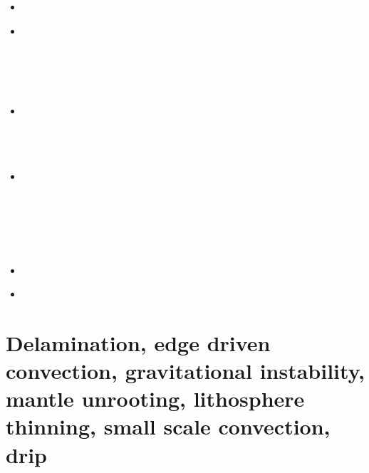\begin{small}
\begin{itemize}
 \\
 \\
 \\
 \\
\item[\twothousandsixteen] 
 \\
\item[\twothousandseventeen] 
 \\
 \\
 \\
 \\
 \\
\item[\twothousandeighteen]
 \\
 \\
 \\
 \\
\item[\twothousandnineteen] 
 \\
 \\
 \\
 \\
 \\
 \\
\item[\twothousandtwenty] 
\\
\item[\twothousandtwentythree] 
 \\
\end{itemize}
\end{small}


\section{Delamination, edge driven convection, gravitational instability, 
mantle unrooting, lithosphere thinning, small scale convection, drip} 


